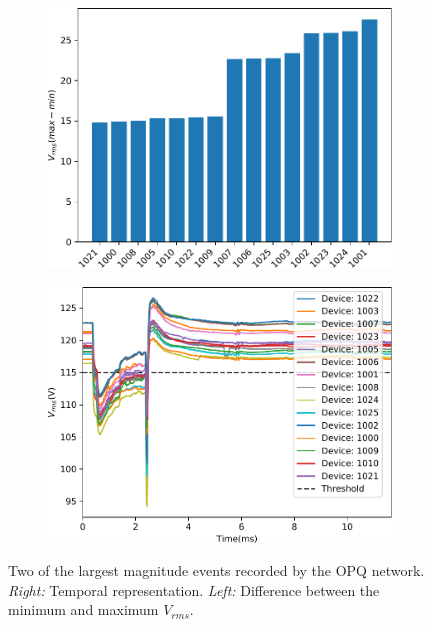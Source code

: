 \begin{figure}[ht!]
\begin{subfigure}{0.49\textwidth}
        \includegraphics[width=1\linewidth]{img/napali_eval/subthreshold/clustering/323282.pdf}
    \end{subfigure}%
    \begin{subfigure}{0.49\textwidth}
        \centering
        \includegraphics[width=1\linewidth]{img/napali_eval/subthreshold/clustering/323282_data.pdf}
    \end{subfigure}
    \caption{
    Two of the largest magnitude events recorded by the OPQ network.
    \textit{Right:} Temporal representation.
    \textit{Left:} Difference between the minimum and maximum $V_{rms}$.
    }
    \label{fig:expdes:sub:ev7}
\end{figure}

